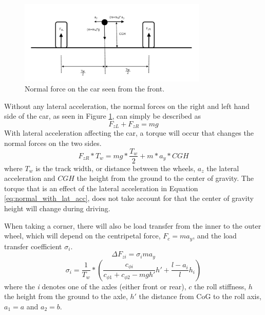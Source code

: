 \begin{figure}[h]
	\centering
	\includegraphics[width=0.8\textwidth]{Pictures/normal_force_lateral}
	\caption{Normal force on the car seen from the front.}
	\label{normal_force_lateral}
\end{figure}
Without any lateral acceleration, the normal forces on the right and left hand side of the car, as seen in Figure  \ref{normal_force_lateral}, can simply be described as
\begin{equation} \label{eq:normal}
	F_{zL} + F_{zR} = mg
\end{equation}
With lateral acceleration affecting the car, a torque will occur that changes the normal forces on the two sides. 
\begin{equation} \label{eq:normal_with_lat_acc}
	F_{zR}*T_{w} = mg*\frac{T_{w}}{2} + m*a_{y}*CGH
\end{equation}
where $ T_{w} $ is the track width, or distance between the wheels, $ a_{z} $ the lateral acceleration and $ CGH $ the height from the ground to the center of gravity. The torque that is an effect of the lateral acceleration in Equation \ref{eq:normal_with_lat_acc}, does not take account for that the center of gravity height will change during driving.

When taking a corner, there will also be load transfer from the inner to the outer wheel, which will depend on the centripetal force, $ F_{c} = ma_{y} $, and the load transfer coefficient $ \sigma_{i} $.
\begin{equation}
	\Delta F_{zi} = \sigma_{i} ma_{y}
\end{equation}
\begin{equation}
	\sigma_{i} = \frac{1}{T_{w}}*( \frac{c_{\phi i}}{c_{\phi 1}+c_{\phi 2} - mgh'}h' + \frac{l-a_{i}}{l}h_{i}) 
\end{equation}
where the \textit{i} denotes one of the axles (either front or rear), $ c $ the roll stiffness, $ h $ the height from the ground to the axle, $ h' $ the distance from CoG to the roll axis, $ a_{1} = a $ and $ a_{2} = b $.


